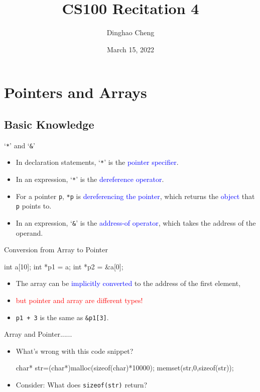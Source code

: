\documentclass{beamer}
\title{CS100 Recitation 4}
\author{Dinghao Cheng}
\institute{Special thanks: Gkxx}
\date{March 15, 2022}
\newcommand{\red}[1]{\textcolor{red}{#1}}
\newcommand{\blue}[1]{\textcolor{blue}{#1}}
\newcommand{\ttt}[1]{\texttt{#1}}
\theoremstyle{definition}
\begin{document}
\begin{frame}
    \titlepage
\end{frame}


\section{Pointers and Arrays}

\subsection{Basic Knowledge}

\begin{frame}{`\ttt{*}' and `\ttt{\&}'}
    \begin{itemize}
        \item In declaration statements, `\ttt{*}' is the \blue{pointer specifier}.
        \item In an expression, `\ttt{*}' is the \blue{dereference operator}.
        \item For a pointer \ttt{p}, \ttt{*p} is \blue{dereferencing the pointer}, which returns the \blue{object} that \ttt{p} points to.
        \item In an expression, `\ttt{\&}' is the \blue{address-of operator}, which takes the address of the operand.
    \end{itemize}
\end{frame}

\begin{frame}[fragile]{Conversion from Array to Pointer}
    \begin{cpp}
int a[10];
int *p1 = a;
int *p2 = &a[0];
    \end{cpp}
    \begin{itemize}
        \item The array can be \blue{implicitly converted} to the address of the first element,
        \item \red{but pointer and array are different types!}
        \pause
        \item \ttt{p1 + 3} is the same as \ttt{\&p1[3]}.
    \end{itemize}
\end{frame}

\begin{frame}[fragile]{Array and Pointer......}
    \begin{itemize}
        \item What's wrong with this code snippet?
        \begin{cpp}
char* str=(char*)malloc(sizeof(char)*10000);
memset(str,0,sizeof(str));
        \end{cpp}
        \pause
        \item Consider: What does \texttt{sizeof(str)} return?
    \end{itemize}
\end{frame}
\end{document}
